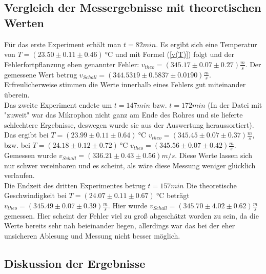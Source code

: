 \documentclass[]{article}
\begin{document}
	\subsection{Vergleich der Messergebnisse mit theoretischen Werten}

	Für das erste Experiment erhält man $t=82min$. Es ergibt sich eine Temperatur von $T=(23.50 \pm 0.11 \pm 0.46)\SI{}{\celsius}$ und mit Formel (\ref{v(T)}) folgt und der Fehlerfortpflanzung eben genannter Fehler: $v_{theo}=(345.17 \pm 0.07 \pm 0.27)\frac{m}{s}$. Der gemessene Wert betrug $v_{Schall} = (344.5319\pm0.5837\pm0.0190) \frac{m}{s}$. Erfreulicherweise stimmen die Werte innerhalb eines Fehlers gut miteinander überein.\\

	Das zweite Experiment endete um $t=147min$ bzw. $t=172min$ (In der Datei mit "zuweit" war das Mikrophon nicht ganz am Ende des Rohres und sie lieferte schlechtere Ergebnisse, deswegen wurde sie aus der Auswertung heraussortiert). Das ergibt bei $T=(23.99 \pm 0.11 \pm 0.64)\SI{}{\celsius}$ $v_{theo}=(345.45 \pm 0.07 \pm 0.37)\frac{m}{s}$, bzw. bei $T=(24.18 \pm 0.12 \pm 0.72)\SI{}{\celsius}$ $v_{theo}=(345.56 \pm 0.07 \pm 0.42)\frac{m}{s}$. Gemessen wurde $v_{Schall} = (336.21 \pm 0.43 \pm 0.56) m/s$. Diese Werte lassen sich nur schwer vereinbaren und es scheint, als wäre diese Messung weniger glücklich verlaufen.\\

	Die Endzeit des dritten Experimentes betrug $t=157min$
	Die theoretische Geschwindigkeit bei $T=(24.07 \pm 0.11 \pm 0.67)\SI{}{\celsius}$ beträgt $v_{theo}=(345.49 \pm 0.07 \pm 0.39)\frac{m}{s}$. Hier wurde  $v_{Schall}=(345.70 \pm 4.02 \pm 0.62)\frac{m}{s}$ gemessen. Hier scheint der Fehler viel zu groß abgeschätzt worden zu sein, da die Werte bereits sehr nah beieinander liegen, allerdings war das bei der eher unsicheren Ablesung und Messung nicht besser möglich.
	
	\subsection{Diskussion der Ergebnisse}
	
	
	
\end{document}
